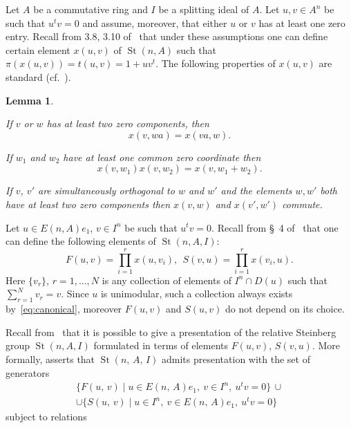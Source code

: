 \documentclass[oneside, 10pt]{amsart}
\DeclareMathOperator{\St}{St}
\numberwithin{equation}{section}
\newtheorem{lemma}{Lemma}
\numberwithin{lemma}{section}
\theoremstyle{definition}
\theoremstyle{remark}
\begin{document}
Let $A$ be a commutative ring and $I$ be a splitting ideal of $A$.
Let $u, v \in A^n$ be such that $u^t v = 0$ and assume, moreover, that either $u$ or $v$ has at least one zero entry.
Recall from 3.8, 3.10 of~\cite{Ka77} that under these assumptions one can define certain element
 $x(u, v)$ of $\St(n, A)$ such that $\pi(x(u, v)) = t(u, v) = 1 + uv^t$.
The following properties of $x(u, v)$ are standard (cf.~\cite[Lemma~1.1]{Tu83}).
\begin{lemma} \label{lem:xsmall-properties}
\begin{lemlist}
 \item \label{item:xsmall-scalar} If $v$ or $w$ has at least two zero components, then 
 \begin{equation}\nonumber x(v, wa) = x(va, w).\end{equation}
 \item \label{item:xsmall-additivity} If $w_1$ and $w_2$ have at least one common zero coordinate then
 \begin{equation}\nonumber x(v, w_1)x(v, w_2) = x(v, w_1+w_2).\end{equation}
 \item \label{item:xsmall-commute} If $v$, $v'$ are simultaneously orthogonal to $w$ and $w'$ and the elements $w, w'$
  both have at least two zero components then $x(v, w)$ and $x(v', w')$ commute.
\end{lemlist}
\end{lemma}

Let $u \in E(n, A)e_1$, $v \in I^n$ be such that $u^tv = 0$.
Recall from \S~4 of~\cite{LS17} that one can define the following elements of $\St(n, A, I)$:
\begin{equation} \label{eq:sigma-definition}
 F(u, v) = \prod\limits_{i=1}^r x(u,  v_i),\ \
 S(v, u) = \prod\limits_{i=1}^r x( v_i, u).
\end{equation}
Here $\{v_r\}$, $r=1,\ldots,N$ is any collection of elements of $I^n \cap D(u)$ such that $\sum_{r=1}^N v_r = v$.
Since $u$ is unimodular, such a collection always exists by~\eqref{eq:canonical}, moreover
 $F(u, v)$ and $S(u, v)$ do not depend on its choice. %

Recall from~\cite{LS17} that it is possible to give a presentation of the relative Steinberg group $\St(n, A, I)$ formulated in terms of elements $F(u, v)$, $S(v, u)$.
More formally, \cite[Proposition 3.10]{LS17} asserts that $\St(n,\,A,\,I)$ admits presentation with the set of generators
\begin{multline*} \{F(u,\,v)\mid u\in E(n,\,A)e_1,\ v\in I^n,\ u^tv=0\}\, \cup \\ \cup \{S(u,\,v)\mid u\in I^n,\ v\in E(n,\,A)e_1,\ u^tv=0\}\end{multline*}
subject to relations
\setcounter{equation}{0}
\renewcommand{\theequation}{R\arabic{equation}}
\end{document}
